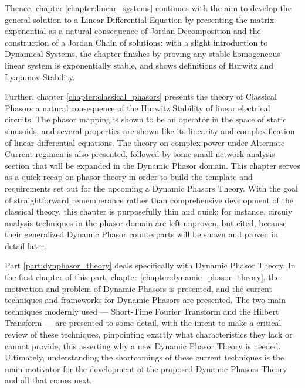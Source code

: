 	Thence, chapter \ref{chapter:linear_systems} continues with the aim to develop the general solution to a Linear Differential Equation by presenting the matrix exponential as a natural consequence of Jordan Decomposition and the construction of a Jordan Chain of solutions; with a slight introduction to Dynamical Systems, the chapter finishes by proving any stable homogeneous linear system is exponentially stable, and shows definitions of Hurwitz and Lyapunov Stability.

	Further, chapter \ref{chapter:classical_phasors} presents the theory of Classical Phasors a natural consequence of the Hurwitz Stability of linear electrical circuits. The phasor mapping is shown to be an operator in the space of static sinusoids, and several properties are shown like its linearity and complexification of linear differential equations. The theory on complex power under Alternate Current regimen is also presented, followed by some small network analysis section that will be expanded in the Dynamic Phasor domain. This chapter serves as a quick recap on phasor theory in order to build the template and requirements set out for the upcoming a Dynamic Phasors Theory. With the goal of straightforward rememberance rather than comprehensive development of the classical theory, this chapter is purposefully thin and quick; for instance, circuiy analysis techniques in the phasor domain are left unproven, but cited, because their generalized Dynamic Phasor counterparts will be shown and proven in detail later.

	Part \ref{part:dynphasor_theory} deals specifically with Dynamic Phasor Theory. In the first chapter of this part, chapter \ref{chapter:dynamic_phasor_theory}, the motivation and problem of Dynamic Phasors is presented, and the current techniques and frameworks for Dynamic Phasors are presented. The two main techniques modernly used — Short-Time Fourier Transform and the Hilbert Transform — are presented to some detail, with the intent to make a critical review of these techniques, pinpointing exactly what characteristics they lack or cannot provide, this asserting why a new Dynamic Phasor Theory is needed. Ultimately, understanding the shortcomings of these current techniques is the main motivator for the development of the proposed Dynamic Phasors Theory and all that comes next.

